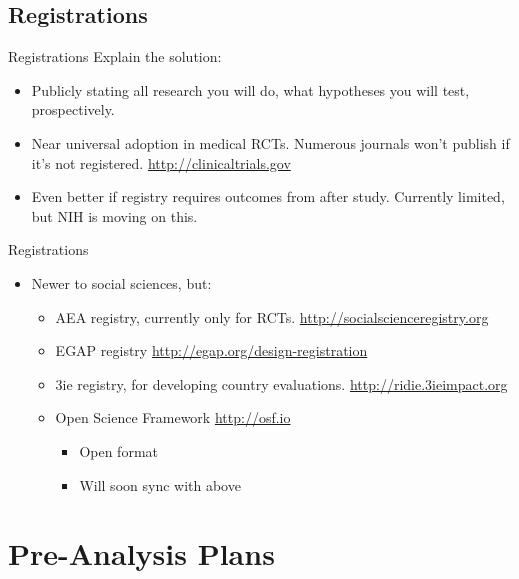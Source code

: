 \documentclass{beamer}
\begin{document}
\subsection*{Registrations}
\begin{frame}{Registrations}
Explain the solution:
 \begin{itemize}
  \item
   Publicly stating all research you will do, what hypotheses you will test, prospectively.
  \item
   Near universal adoption in medical RCTs. Numerous journals won't publish if it's not registered. \url{http://clinicaltrials.gov}
  \item
   Even better if registry requires outcomes from after study. Currently limited, but NIH is moving on this.
\end{itemize}
\end{frame}
\begin{frame}{Registrations}
\begin{itemize}
   \item Newer to social sciences, but:
   \begin{itemize}[<.->]
   \item
   	AEA registry, currently only for RCTs. \url{http://socialscienceregistry.org}
   \item
    EGAP registry \url{http://egap.org/design-registration}
   \item 
    3ie registry, for developing country evaluations. \url{http://ridie.3ieimpact.org}
   \item
   	Open Science Framework \url{http://osf.io}
   	\begin{itemize}
   	\item
   	Open format
   	\item
   	Will soon sync with above
   	\end{itemize}
   \end{itemize}
  \end{itemize}  
\end{frame}

\section{Pre-Analysis Plans}
\end{document}
